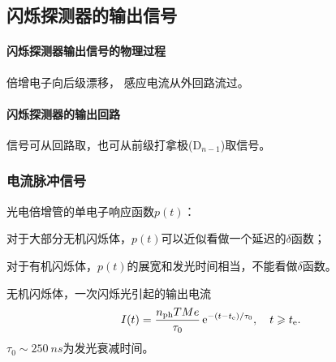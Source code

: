 \subsection{闪烁探测器的输出信号}
\paragraph{闪烁探测器输出信号的物理过程}
倍增电子向后级漂移，
感应电流从外回路流过。
\paragraph{闪烁探测器的输出回路}
信号可从回路取，也可从前级打拿极(D$_{n-1}$)取信号。
\subsubsection{电流脉冲信号}
光电倍增管的单电子响应函数$p(t)$：
\begin{compactitem}
	\item 对于大部分无机闪烁体，$p(t)$可以近似看做一个延迟的$\delta$函数；
	\item 对于有机闪烁体，$p(t)$的展宽和发光时间相当，不能看做$\delta$函数。
\end{compactitem}
无机闪烁体，一次闪烁光引起的输出电流
\[
	I(t)=\frac{n_{\mathrm{ph}}TMe}{\tau_0}\mathop{}\!\mathrm{e}^{-(t-t_\mathrm e)/\tau_0},\quad t\geqslant t_\mathrm e.
\]
$\tau_0\sim\SI{250}{ns}$为发光衰减时间。
